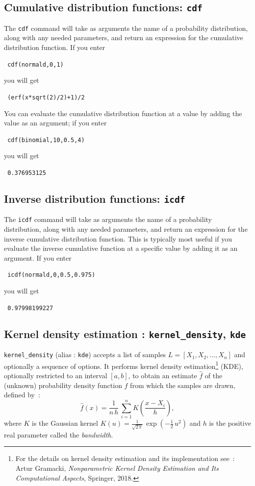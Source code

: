 \documentclass[a4paper,11pt]{book}
\begin{document}
\subsection{Cumulative distribution functions: \texttt{cdf}}

The \texttt{cdf} command will take as arguments the name of a
probability distribution, along with any needed parameters, and return
an expression for the cumulative distribution function.  If you enter
\begin{center}
  \tt
  cdf(normald,0,1)
\end{center}
you will get
\begin{center}
  \tt
  (erf(x*sqrt(2)/2)+1)/2  
\end{center}

You can evaluate the cumulative distribution function at a value by
adding the value as an argument; if you enter
\begin{center}
  \tt
  cdf(binomial,10,0.5,4)
\end{center}
you will get
\begin{center}
  \tt
  0.376953125
\end{center}

\subsection{Inverse distribution functions: \texttt{icdf}}

The \texttt{icdf} command will take as arguments the name of a
probability distribution, along with any needed parameters, and return
an expression for the inverse cumulative distribution function.  This
is typically most useful if you evaluate the inverse cumulative
function at a specific value by adding it as an argument.  If you enter
\begin{center}
  \tt
  icdf(normald,0,0.5,0.975)
\end{center}
you will get
\begin{center}
  \tt
  0.97998199227
\end{center}

\subsection{Kernel density estimation : {\tt kernel\_density}, {\tt kde}}
{\tt kernel\_density} (alias : {\tt kde}) accepts a list of samples $L=[X_1,X_2,\dots,X_n]$ and optionally a sequence of options. It performs kernel density estimation\footnote{For the details on kernel density estimation and its implementation see~: Artur Gramacki, {\it Nonparametric Kernel Density Estimation and Its Computational Aspects}, Springer, 2018.} (KDE), optionally restricted to an interval $[a,b]$, to obtain an estimate $\hat{f}$ of the (unknown) probability density function $f$ from which the samples are drawn, defined by~:
\begin{equation}\label{eq:kde1}
  \hat{f}(x)=\frac{1}{n\,h}\,\sum_{i=1}^nK\left(\frac{x-X_i}{h}\right),
\end{equation}
where $K$ is the Gaussian kernel $K(u)=\frac{1}{\sqrt{2\,\pi}}\,\exp\left(-\frac{1}{2}\,u^2\right)$ and $h$ is the positive real parameter called the \emph{bandwidth}.
\end{document}

